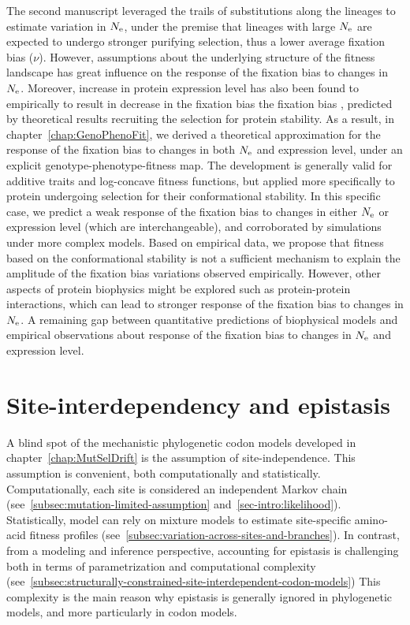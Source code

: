 The second manuscript leveraged the trails of substitutions along the lineages to estimate variation in $N_{\textrm{e}}$, under the premise that lineages with large $N_{\textrm{e}}$ are expected to undergo stronger purifying selection, thus a lower average fixation bias ($\nu$).
However, assumptions about the underlying structure of the fitness landscape has great influence on the response of the fixation bias to changes in $N_{\textrm{e}}$.
Moreover, increase in protein expression level has also been found to empirically to result in decrease in the fixation bias the fixation bias , predicted by theoretical results recruiting the selection for protein stability.
As a result, in chapter~\ref{chap:GenoPhenoFit}, we derived a theoretical approximation for the response of the fixation bias to changes in both $N_{\textrm{e}}$ and expression level, under an explicit genotype-phenotype-fitness map.
The development is generally valid for additive traits and log-concave fitness functions, but applied more specifically to protein undergoing selection for their conformational stability.
In this specific case, we predict a weak response of the fixation bias to changes in either $N_{\textrm{e}}$ or expression level (which are interchangeable), and corroborated by simulations under more complex models.
Based on empirical data, we propose that fitness based on the conformational stability is not a sufficient mechanism to explain the amplitude of the fixation bias variations observed empirically.
However, other aspects of protein biophysics might be explored such as protein-protein interactions, which can lead to stronger response of the fixation bias to changes in $N_{\textrm{e}}$.
A remaining gap between quantitative predictions of biophysical models and empirical observations about response of the fixation bias to changes in $N_{\textrm{e}}$ and expression level.


\section{Site-interdependency and epistasis}
\label{sec:epistasis-and-entrenchment}

A blind spot of the mechanistic phylogenetic codon models developed in chapter~\ref{chap:MutSelDrift} is the assumption of site-independence.
This assumption is convenient, both computationally and statistically.
Computationally, each site is considered an independent Markov chain (see~\ref{subsec:mutation-limited-assumption} and~\ref{sec-intro:likelihood}).
Statistically, model can rely on mixture models to estimate site-specific amino-acid fitness profiles (see~\ref{subsec:variation-across-sites-and-branches}).
In contrast, from a modeling and inference perspective, accounting for epistasis is challenging both in terms of parametrization and computational complexity (see~\ref{subsec:structurally-constrained-site-interdependent-codon-models})
This complexity is the main reason why epistasis is generally ignored in phylogenetic models, and more particularly in codon models.

